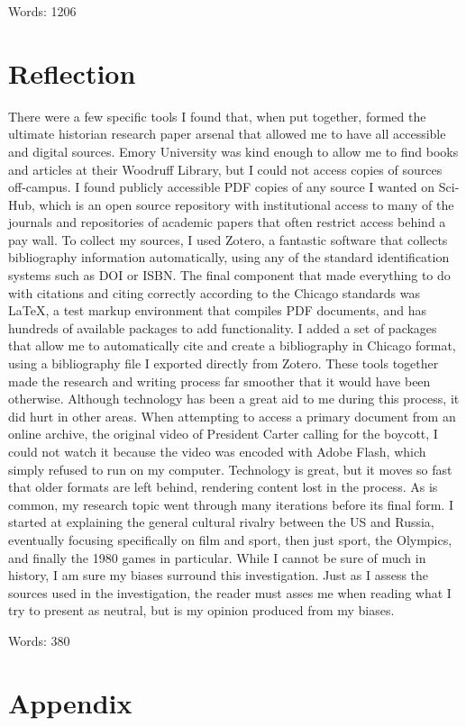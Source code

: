 \documentclass[12pt,letterpaper]{article}
\begin{document}
Words: 1206

\newpage
\section{Reflection}

There were a few specific tools I found that, when put together, formed the ultimate historian research paper arsenal that allowed me to have all accessible and digital sources. Emory University was kind enough to allow me to find books and articles at their Woodruff Library, but I could not access copies of sources off-campus. I found publicly accessible PDF copies of any source I wanted on Sci-Hub, which is an open source repository with institutional access to many of the journals and repositories of academic papers that often restrict access behind a pay wall. To collect my sources, I used Zotero, a fantastic software that collects bibliography information automatically, using any of the standard identification systems such as DOI or ISBN. The final component that made everything to do with citations and citing correctly according to the Chicago standards was \LaTeX{}, a test markup environment that compiles PDF documents, and has hundreds of available packages to add functionality. I added a set of packages that allow me to automatically cite and create a bibliography in Chicago format, using a bibliography file I exported directly from Zotero. These tools together made the research and writing process far smoother that it would have been otherwise. Although technology has been a great aid to me during this process, it did hurt in other areas. When attempting to access a primary document from an online archive, the original video of President Carter calling for the boycott, I could not watch it because the video was encoded with Adobe Flash, which simply refused to run on my computer. Technology is great, but it moves so fast that older formats are left behind, rendering content lost in the process. As is common, my research topic went through many iterations before its final form. I started at explaining the general cultural rivalry between the US and Russia, eventually focusing specifically on film and sport, then just sport, the Olympics, and finally the 1980 games in particular. While I cannot be sure of much in history, I am sure my biases surround this investigation. Just as I assess the sources used in the investigation, the reader must asses me when reading what I try to present as neutral, but is my opinion produced from my biases. 

Words: 380

\newpage
\nocite{*}
\printbibliography

\newpage
\section{Appendix}
\listoffigures
\end{document}
